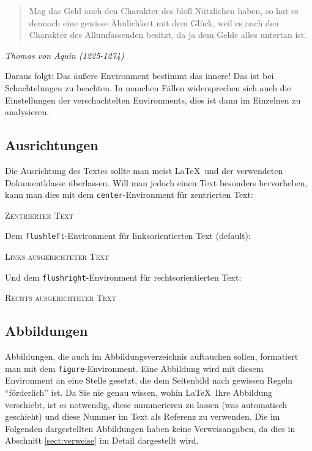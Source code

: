 \begin{quote}
Mag das Geld auch den Charakter des bloß Nützlichen haben, so 
hat es dennoch eine gewisse Ähnlichkeit mit dem Glück, weil es 
auch den Charakter des Allumfassenden besitzt, da ja dem Gelde 
alles untertan ist.
\end{quote}
\begin{flushright}
\textsl{Thomas von Aquin (1225-1274)}
\end{flushright}
Daraus folgt: Das äußere Environment bestimmt das innere! Das ist bei Schachtelungen zu beachten. In manchen Fällen widersprechen sich auch die Einstellungen der verschachtelten Environments, dies ist dann im Einzelnen zu analysieren.

\subsection{Ausrichtungen}\label{sect:ausrichtung}

Die Ausrichtung des Textes sollte man meist \LaTeX\ und der verwendeten Dokumentklasse überlassen. Will man jedoch einen Text besonders hervorheben, kann man dies mit dem \texttt{center}-Environment für zentrierten Text:
\begin{center}
\textsc{Zentrierter Text}
\end{center}

\noindent Dem \texttt{flushleft}-Environment für linksorientierten Text (default):

\begin{flushleft}
\textsc{Links ausgerichteter Text}
\end{flushleft}

\noindent Und dem \texttt{flushright}-Environment für rechtsorientierten Text:

\begin{flushright}
\textsc{Rechts ausgerichteter Text}
\end{flushright}

\subsection{Abbildungen}

Abbildungen, die auch im Abbildungsverzeichnis auftauchen sollen, formatiert man mit dem \texttt{figure}-Environment. Eine Abbildung wird mit diesem Environment an eine Stelle gesetzt, die dem Seitenbild nach gewissen Regeln "`förderlich"' ist. Da Sie nie genau wissen, wohin \LaTeX\ Ihre Abbildung verschiebt, ist es notwendig, diese nummerieren zu lassen (was automatisch geschieht) und diese Nummer im Text als Referenz zu verwenden. Die im Folgenden dargestellten Abbildungen haben keine Verweisangaben, da dies in Abschnitt \ref{sect:verweise} im Detail dargestellt wird. 

